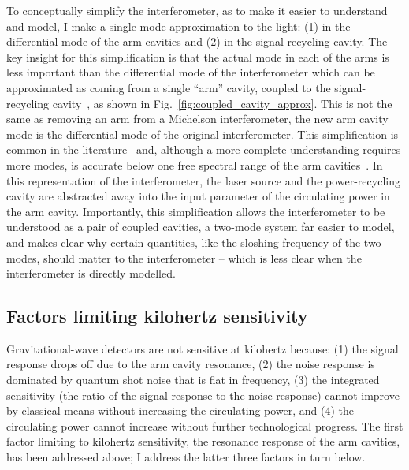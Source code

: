 To conceptually simplify the interferometer, as to make it easier to understand and model, I make a single-mode approximation to the light: (1) in the differential mode of the arm cavities and (2) in the signal-recycling cavity. %
The key insight for this simplification is that the actual mode in each of the arms is less important than the differential mode of the interferometer which can be approximated as coming from a single ``arm'' cavity, coupled to the signal-recycling cavity~\cite{}, as shown in Fig.~\ref{fig:coupled_cavity_approx}. This is not the same as removing an arm from a Michelson interferometer, the new arm cavity mode is the differential mode of the original interferometer. 
This simplification is common in the literature~\cite{Korobko2019,Adya2020} and, although a more complete understanding requires more modes, is accurate below one free spectral range of the arm cavities~\cite{Miaoetal2015,}. In this representation of the interferometer, the laser source and the power-recycling cavity are abstracted away into the input parameter of the circulating power in the arm cavity.
Importantly, this simplification allows the interferometer to be understood as a pair of coupled cavities, a two-mode system far easier to model, and makes clear why certain quantities, like the sloshing frequency of the two modes, should matter to the interferometer -- which is less clear when the interferometer is directly modelled.


\subsection{Factors limiting kilohertz sensitivity}

Gravitational-wave detectors are not sensitive at kilohertz because: (1) the signal response drops off due to the arm cavity resonance, (2) the noise response is dominated by quantum shot noise that is flat in frequency, (3) the integrated sensitivity (the ratio of the signal response to the noise response) cannot improve by classical means without increasing the circulating power, and (4) the circulating power cannot increase without further technological progress.
The first factor limiting to kilohertz sensitivity, the resonance response of the arm cavities, has been addressed above; I address the latter three factors in turn below.

